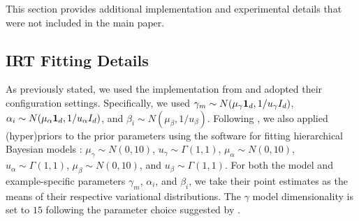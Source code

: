 \label{app:add-details}
This section provides additional implementation and experimental details that were not included in the main paper.

\subsection{IRT Fitting Details} \label{app:fitting_details}
%
As previously stated, we used the implementation from \citet{tinybenchmarks} and adopted their configuration settings. Specifically, we used $\gamma_m \sim N(\mu_{\gamma}\bm{1}_d, 1/u_{\gamma}I_d)$, $\alpha_{i} \sim N(\mu_{\alpha}\bm{1}_d, 1/u_{\alpha}I_d)$, and $\beta_{i} \sim N(\mu_\beta, 1/u_\beta)$.
Following \citet{tinybenchmarks}, we also applied (hyper)priors to the prior parameters using the software for fitting hierarchical Bayesian models \citep{lalor2023py}: $\mu_{\gamma} \sim N(0, 10)$, $u_{\gamma} \sim \Gamma(1, 1)$, $\mu_{\alpha} \sim N(0, 10)$, $u_{\alpha} \sim \Gamma(1, 1)$, $\mu_\beta \sim N(0, 10)$, and $u_\beta \sim \Gamma(1, 1)$. 
For both the model and example-specific parameters $\gamma_m$, $\alpha_{i}$, and $\beta_{i}$, we take their point estimates as the means of their respective variational distributions. 
The $\gamma$ model dimensionality is set to $15$ following the parameter choice suggested by \citet{tinybenchmarks}.


